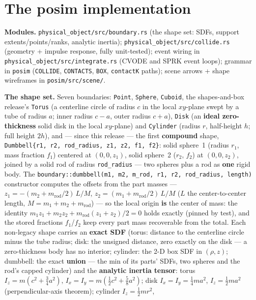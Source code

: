\documentclass[11pt]{article}
\newcommand{\kw}[1]{\texttt{\uppercase{#1}}}
\newcommand{\code}[1]{\texttt{#1}}
\begin{document}
\section{The posim implementation}

\textbf{Modules.} \code{physical\_object/src/boundary.rs} (the shape set:
SDFs, support extents/points/ranks, analytic inertia);
\code{physical\_object/src/collide.rs} (geometry + impulse response, fully
unit-tested); event wiring in \code{physical\_object/src/integrate.rs} (CVODE
and SPRK event loops); grammar in \code{posim} (\kw{collide}, \kw{contacts},
\kw{box}, \code{contactK} paths); scene arrows + shape wireframes in
\code{posim/src/scene/}.

\textbf{The shape set.} Seven boundaries: \code{Point}, \code{Sphere},
\code{Cuboid}, the shapes-and-box release's \code{Torus} (a centerline
circle of radius $c$ in the local $xy$-plane swept by a tube of radius $a$;
inner radius $c-a$, outer radius $c+a$), \code{Disk} (an \textbf{ideal
zero-thickness} solid disk in the local $xy$-plane) and \code{Cylinder}
(radius $r$, half-height $h$; full height $2h$), and --- since this
release --- the first \textbf{compound} shape,
\code{Dumbbell\{r1, r2, rod\_radius, z1, z2, f1, f2\}}: solid sphere~1
(radius $r_1$, mass fraction $f_1$) centered at $(0, 0, z_1)$, solid
sphere~2 ($r_2$, $f_2$) at $(0, 0, z_2)$, joined by a solid rod of radius
\code{rod\_radius} --- two spheres plus a rod as \textbf{one} rigid body.
The \code{boundary::dumbbell(m1, m2, m\_rod, r1, r2, rod\_radius, length)}
constructor computes the offsets from the part masses ---
$z_1 = -(m_2 + m_{\mathrm{rod}}/2)\,L/M$,
$z_2 = (m_1 + m_{\mathrm{rod}}/2)\,L/M$ ($L$ the center-to-center length,
$M = m_1 + m_2 + m_{\mathrm{rod}}$) --- so the local origin \textbf{is} the
center of mass: the identity
$m_1 z_1 + m_2 z_2 + m_{\mathrm{rod}}(z_1 + z_2)/2 = 0$ holds exactly
(pinned by test), and the stored fractions $f_1$/$f_2$ keep every part mass
recoverable from the total. Each non-legacy shape carries an \textbf{exact
SDF} (torus: distance to the centerline circle minus the tube radius; disk:
the unsigned distance, zero exactly on the disk --- a zero-thickness body
has no interior; cylinder: the 2-D box SDF in $(\rho, z)$; dumbbell: the
exact \textbf{union} --- the min of its parts' SDFs, two spheres and the
rod's capped cylinder) and the \textbf{analytic inertia tensor}: torus
$I_z = m(c^2 + \tfrac34 a^2)$, $I_x = I_y = m(\tfrac12 c^2 + \tfrac58 a^2)$;
disk $I_x = I_y = \tfrac14 m a^2$, $I_z = \tfrac12 m a^2$
(perpendicular-axis theorem); cylinder $I_z = \tfrac12 m r^2$,
\end{document}
